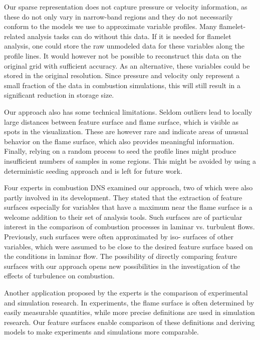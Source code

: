 %
Our sparse representation does not capture pressure or velocity information, as
these do not only vary in narrow-band regions and they do not necessarily
conform to the models we use to approximate variable profiles.
%
Many flamelet-related analysis tasks can do without this data.
%
If it is needed for flamelet analysis, one could store the raw unmodeled data
for these variables along the profile lines.
%
It would however not be possible to reconstruct this data on the original grid
with sufficient accuracy.
%
As an alternative, these variables could be stored in the original resolution.
%
Since pressure and velocity only represent a small fraction of the data in
combustion simulations, this will still result in a significant reduction in
storage size.
%

%
Our approach also has some technical limitations.
%
Seldom outliers lead to locally large distances between feature surface and
flame surface, which is visible as spots in the visualization.
%
These are however rare and indicate areas of unusual behavior on the flame
surface, which also provides meaningful information.
%
%
Finally, relying on a random process to seed the profile lines might produce
insufficient numbers of samples in some regions.
%
This might be avoided by using a deterministic seeding approach and is left for
future work.
%

%
Four experts in combustion \ac{DNS} examined our approach, two of which were
also partly involved in its development.
%
They stated that the extraction of feature surfaces especially for variables
that have a maximum near the flame surface is a welcome addition to their set of
analysis tools.
%
Such surfaces are of particular interest in the comparison of combustion
processes in laminar vs. turbulent flows.
%
Previously, such surfaces were often approximated by iso- surfaces of other
variables, which were assumed to be close to the desired feature surface based
on the conditions in laminar flow.
%
The possibility of directly comparing feature surfaces with our approach opens
new possibilities in the investigation of the effects of turbulence on
combustion.
%

%
Another application proposed by the experts is the comparison of experimental
and simulation research.
%
In experiments, the flame surface is often determined by easily measurable
quantities, while more precise definitions are used in simulation research.
%
Our feature surfaces enable comparison of these definitions and deriving models
to make experiments and simulations more comparable.
%

